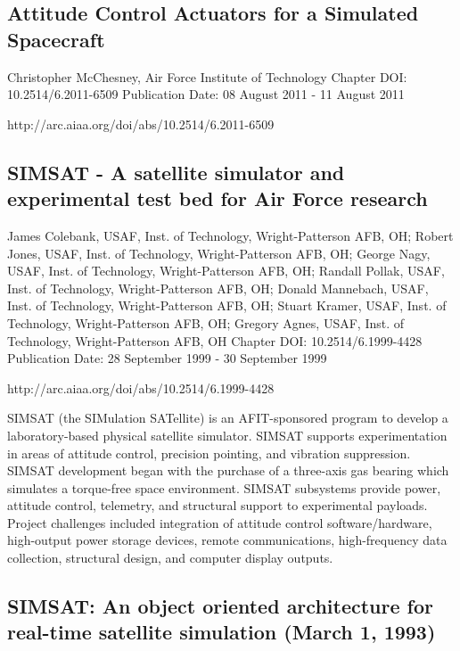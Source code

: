 \subsection{Attitude Control Actuators for a Simulated Spacecraft}

Christopher McChesney, Air Force Institute of Technology
Chapter DOI: 10.2514/6.2011-6509
Publication Date: 08 August 2011 - 11 August 2011

http://arc.aiaa.org/doi/abs/10.2514/6.2011-6509

\subsection{SIMSAT - A satellite simulator and experimental test bed for Air Force research}

James Colebank, USAF, Inst. of Technology, Wright-Patterson AFB, OH; Robert Jones, USAF, Inst. of Technology, Wright-Patterson AFB, OH; George Nagy, USAF, Inst. of Technology, Wright-Patterson AFB, OH; Randall Pollak, USAF, Inst. of Technology, Wright-Patterson AFB, OH; Donald Mannebach, USAF, Inst. of Technology, Wright-Patterson AFB, OH; Stuart Kramer, USAF, Inst. of Technology, Wright-Patterson AFB, OH; Gregory Agnes, USAF, Inst. of Technology, Wright-Patterson AFB, OH
Chapter DOI: 10.2514/6.1999-4428
Publication Date: 28 September 1999 - 30 September 1999

http://arc.aiaa.org/doi/abs/10.2514/6.1999-4428

SIMSAT (the SIMulation SATellite) is an AFIT-sponsored program to develop a laboratory-based physical satellite simulator. SIMSAT supports experimentation in areas of attitude control, precision pointing, and vibration suppression. SIMSAT development began with the purchase of a three-axis gas bearing which simulates a torque-free space environment. SIMSAT subsystems provide power, attitude control, telemetry, and structural support to experimental payloads. Project challenges included integration of attitude control software/hardware, high-output power storage devices, remote communications, high-frequency data collection, structural design, and computer display outputs.


\subsection{SIMSAT: An object oriented architecture for real-time satellite simulation (March 1, 1993)}

